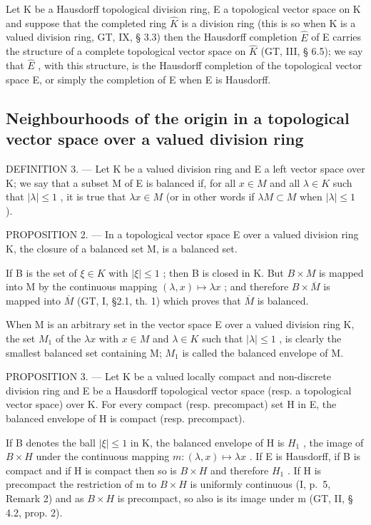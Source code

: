Let K be a Hausdorff topological division ring, E a topological vector space on K and suppose that the completed ring \(\hat{K}\) is a division ring (this is so when K is a valued division ring, GT, IX, § 3.3) then the Hausdorff completion \(\hat{E}\) of E carries the structure of a complete topological vector space on \(\hat{K}\) (GT, III, § 6.5); we say that \(\hat{E}\) , with this structure, is the Hausdorff completion of the topological vector space E, or simply the completion of E when E is Hausdorff.

\subsection{Neighbourhoods of the origin in a topological vector space over a valued division ring}

DEFINITION 3. --- Let K be a valued division ring and E a left vector space over K; we say that a subset M of E is balanced if, for all \(x \in M\) and all \(\lambda \in K\) such that \(|\lambda| \leqslant 1\) , it is true that \(\lambda x \in M\) (or in other words if \(\lambda M \subset M\) when \(|\lambda| \leqslant 1\) ).

PROPOSITION 2. --- In a topological vector space E over a valued division ring K, the closure of a balanced set M, is a balanced set.

If B is the set of \(\xi\in K\) with \(|\xi|\leqslant1\) ; then B is closed in K. But \(B\times M\) is mapped into M by the continuous mapping \((\lambda,x)\mapsto\lambda x\) ; and therefore \(B\times\overline{M}\) is mapped into \(\overline{M}\) (GT, I, §2.1, th. 1) which proves that \(\overline{M}\) is balanced.

When M is an arbitrary set in the vector space E over a valued division ring K, the set \(M_{1}\) of the \(\lambda x\) with \(x \in M\) and \(\lambda \in K\) such that \(|\lambda| \leqslant 1\) , is clearly the smallest balanced set containing M; \(M_{1}\) is called the balanced envelope of M.

PROPOSITION 3. --- Let K be a valued locally compact and non-discrete division ring and E be a Hausdorff topological vector space (resp. a topological vector space) over K. For every compact (resp. precompact) set H in E, the balanced envelope of H is compact (resp. precompact).

If B denotes the ball \(|\xi| \leqslant 1\) in K, the balanced envelope of H is \(H_{1}\) , the image of \(B \times H\) under the continuous mapping \(m: (\lambda, x) \mapsto \lambda x\) . If E is Hausdorff, if B is compact and if H is compact then so is \(B \times H\) and therefore \(H_{1}\) . If H is precompact the restriction of m to \(B \times H\) is uniformly continuous (I, p.~5, Remark 2) and as \(B \times H\) is precompact, so also is its image under m (GT, II, § 4.2, prop. 2).

